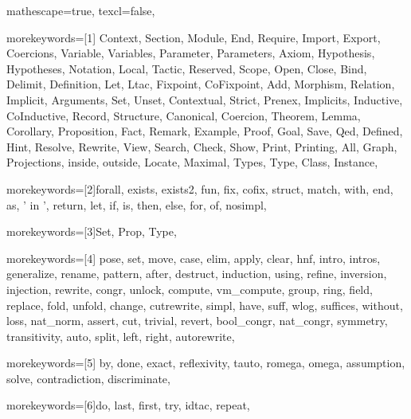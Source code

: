 
 {

mathescape=true,						
texcl=false,


morekeywords=[1]{
Context, Section, Module, End, Require, Import, Export, Coercions,
Variable, Variables, Parameter, Parameters, Axiom, Hypothesis, Hypotheses,
Notation, Local, Tactic, Reserved, Scope, Open, Close, Bind, Delimit,
Definition, Let, Ltac, Fixpoint, CoFixpoint, Add, Morphism, Relation,
Implicit, Arguments, Set, Unset, Contextual, Strict, Prenex, Implicits,
Inductive, CoInductive, Record, Structure, Canonical, Coercion,
Theorem, Lemma, Corollary, Proposition, Fact, Remark, Example,
Proof, Goal, Save, Qed, Defined, Hint, Resolve, Rewrite, View,
Search, Check, Show, Print, Printing, All, Graph, Projections, inside,
outside, Locate, Maximal, Types, Type, Class, Instance},

morekeywords=[2]{forall, exists, exists2, fun, fix, cofix, struct,
      match, with, end, as, ' in ', return, let, if, is, then, else,
      for, of, nosimpl},

morekeywords=[3]{Set, Prop, Type},

morekeywords=[4]{
         pose, set, move, case, elim, apply, clear,
            hnf, intro, intros, generalize, rename, pattern, after,
	    destruct, induction, using, refine, inversion, injection,
         rewrite, congr, unlock, compute, vm_compute, group, ring, field,
            replace, fold, unfold, change, cutrewrite, simpl,
         have, suff, wlog, suffices, without, loss, nat_norm,
            assert, cut, trivial, revert, bool_congr, nat_congr,
	 symmetry, transitivity, auto, split, left, right, autorewrite},        

morekeywords=[5]{
         by, done, exact, reflexivity, tauto, romega, omega,
         assumption, solve, contradiction, discriminate},


morekeywords=[6]{do, last, first, try, idtac, repeat},

}
